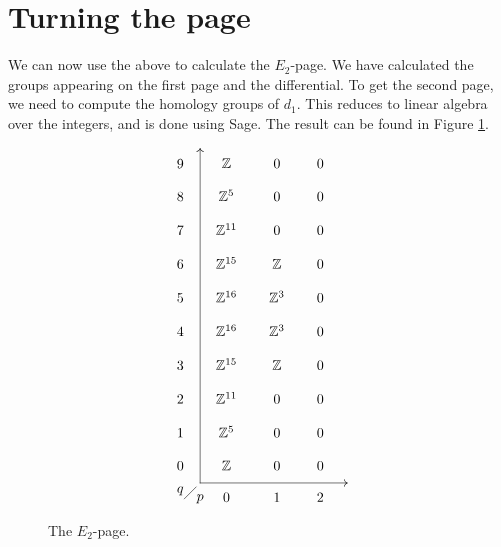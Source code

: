 \section{Turning the page}
\label{sec:rand}

We can now use the above to calculate the $E_2$-page. We have
calculated the groups appearing on the first page and the
differential. To get the second page, we need to compute the homology
groups of $d_1$. This reduces to linear algebra over the integers, and
is done using Sage. The result can be found in Figure \ref{e2}.

\begin{figure}[ht]
  \[ \xy
  (5,4); (5,-80); **\dir{-}; (5,4); *\dir{>};
  (5,-80); (42,-80); **\dir{-}; *\dir{<};
  (0,-82)*{q}; (5,-84)*{p};
  (1,-84); (4,-81); **\dir{-};
  (0,0)\xymatrix@R=1em@C=1.7em{
    9 & \Z & 0 & 0 \\
    8 & \Z^5 & 0 & 0 \\
    7 & \Z^{11} & 0 & 0 \\
    6 & \Z^{15} & \Z & 0 \\
    5 & \Z^{16} & \Z^{3} & 0 \\
    4 & \Z^{16} & \Z^{3} & 0 \\
    3 & \Z^{15} & \Z & 0 \\
    2 & \Z^{11} & 0 & 0 \\
    1 & \Z^{5} & 0 & 0 \\
    0 & \Z & 0 & 0 \\
    & 0 & 1 & 2
  } \endxy \]
  \caption{The $E_2$-page.}
  \label{e2}
\end{figure}

